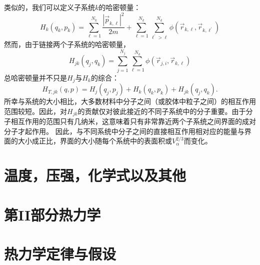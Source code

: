 \documentclass[UTF8]{ctexart}
\numberwithin{equation}{section}%
\numberwithin{figure}{section}%
\begin{document}
    类似的，我们可以定义子系统$k$的哈密顿量：
    \begin{equation}
        H_{k}\left(q_{k}, p_{k}\right)=\sum_{\ell=1}^{N_{k}} \frac{\left|\vec{p}_{k, \ell}\right|^{2}}{2 m}+\sum_{\ell=1}^{N_{k}} \sum_{\ell^{\prime}>\ell}^{N_{k}} \phi\left(\vec{r}_{k, \ell}, \vec{r}_{k, \ell^{\prime}}\right)
    \end{equation}
    然而，由于链接两个子系统的哈密顿量，
    \begin{equation}
        H_{j k}\left(q_{j}, q_{k}\right)=\sum_{j=1}^{N_{j}} \sum_{\ell=1}^{N_{k}} \phi\left(\vec{r}_{j, i}, \vec{r}_{k, \ell}\right)
    \end{equation}
    总哈密顿量并不只是$H_j$与$H_k$的综合：
    \begin{equation}
        H_{T, j k}(q, p)=H_{j}\left(q_{j}, p_{j}\right)+H_{k}\left(q_{k}, p_{k}\right)+H_{j k}\left(q_{j}, q_{k}\right) .
    \end{equation}
    所幸与系统的大小相比，大多数材料中分子之间（或胶体中粒子之间）的相互作用范围较短。因此，对$H_{jk}$的贡献仅对彼此接近的不同子系统中的分子重要。由于分子相互作用的范围只有几纳米，这意味着只有非常靠近两个子系统之间界面的成对分子才起作用。
    因此，与不同系统中分子之间的直接相互作用相对应的能量与界面的大小成正比，界面的大小随每个系统中的表面积或$V_\alpha^{2/3}$而变化。




    \clearpage
    \section{温度，压强，化学式以及其他}\label{chap8}

    \clearpage
    \section*{第II部分\quad 热力学}
    \label{part2}
    \section{热力学定律与假设}\label{chap9}


    
\end{document}

